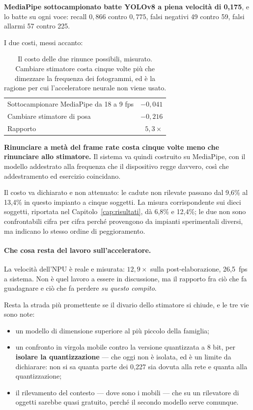 \textbf{MediaPipe sottocampionato batte YOLOv8 a piena velocità di 0,175}, e lo batte su ogni voce: recall $0{,}866$ contro $0{,}775$, falsi negativi 49 contro 59, falsi allarmi 57 contro 225.

I due costi, messi accanto:

\begin{table}[ht]
\centering
\caption{Il costo delle due rinunce possibili, misurato. Cambiare stimatore
costa cinque volte più che dimezzare la frequenza dei fotogrammi, ed è la
ragione per cui l'acceleratore neurale non viene usato.}
\label{tab:scomposizione}
\begin{tabular}{lr}
\toprule
Sottocampionare MediaPipe da 18 a 9 fps & $-0{,}041$ \\
Cambiare stimatore di posa & $-0{,}216$ \\
\midrule
Rapporto & $5{,}3\times$ \\
\bottomrule
\end{tabular}
\end{table}

\textbf{Rinunciare a metà del frame rate costa cinque volte meno che rinunciare allo stimatore.} Il sistema va quindi costruito su MediaPipe, con il modello addestrato alla frequenza che il dispositivo regge davvero, così che addestramento ed esercizio coincidano.

Il costo va dichiarato e non attenuato: le cadute non rilevate passano dal 9,6\% al 13,4\% in questo impianto a cinque soggetti. La misura corrispondente sui dieci soggetti, riportata nel Capitolo~\ref{cap:risultati}, dà 6,8\% e 12,4\%; le due non sono confrontabili cifra per cifra perché provengono da impianti sperimentali diversi, ma indicano lo stesso ordine di peggioramento.

\paragraph{Che cosa resta del lavoro sull'acceleratore.}

La velocità dell'NPU è reale e misurata: $12{,}9\times$ sulla post-elaborazione, 26,5~fps a sistema. Non è quel lavoro a essere in discussione, ma il rapporto fra ciò che fa guadagnare e ciò che fa perdere \emph{su questo compito}.

Resta la strada più promettente se il divario dello stimatore si chiude, e le tre vie sono note:

\begin{itemize}
\item un modello di dimensione superiore al più piccolo della famiglia;
\item un confronto in virgola mobile contro la versione quantizzata a 8 bit, per \textbf{isolare la quantizzazione} --- che oggi non è isolata, ed è un limite da dichiarare: non si sa quanta parte dei 0,227 sia dovuta alla rete e quanta alla quantizzazione;
\item il rilevamento del contesto --- dove sono i mobili --- che su un rilevatore di oggetti sarebbe quasi gratuito, perché il secondo modello serve comunque.
\end{itemize}

